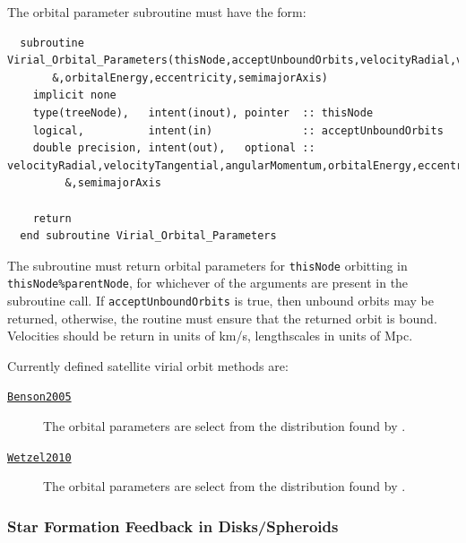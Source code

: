 The orbital parameter subroutine must have the form:
\begin{verbatim}
  subroutine Virial_Orbital_Parameters(thisNode,acceptUnboundOrbits,velocityRadial,velocityTangential,angularMomentum&
       &,orbitalEnergy,eccentricity,semimajorAxis)
    implicit none
    type(treeNode),   intent(inout), pointer  :: thisNode
    logical,          intent(in)              :: acceptUnboundOrbits
    double precision, intent(out),   optional :: velocityRadial,velocityTangential,angularMomentum,orbitalEnergy,eccentricity&
         &,semimajorAxis

    return
  end subroutine Virial_Orbital_Parameters
\end{verbatim}
The subroutine must return orbital parameters for {\tt thisNode} orbitting in {\tt thisNode\%parentNode}, for whichever of the arguments are present in the subroutine call. If {\tt acceptUnboundOrbits} is true, then unbound orbits may be returned, otherwise, the routine must ensure that the returned orbit is bound. Velocities should be return in units of km/s, lengthscales in units of Mpc.

Currently defined satellite virial orbit methods are:
\begin{description}
 \item [\hyperlink{satellites.merging.virial_orbits.Benson2005.F90:virial_orbits_benson2005:virial_orbital_parameters_benson2005}{{\tt Benson2005}}] The orbital parameters are select from the distribution found by \cite{benson_orbital_2005}.
 \item [\hyperlink{satellites.merging.virial_orbits.Wetzel2010.F90:virial_orbits_wetzel2010:virial_orbital_parameters_wetzel2010}{{\tt Wetzel2010}}] The orbital parameters are select from the distribution found by \cite{wetzel_orbits_2010}.
\end{description}

\subsubsection{Star Formation Feedback in Disks/Spheroids}

